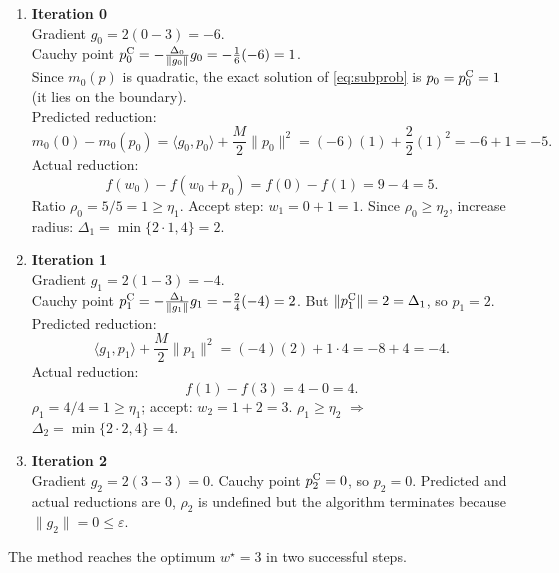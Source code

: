 \documentclass{article}
\begin{document}
\begin{enumerate}[label=Iteration \arabic*:, leftmargin=*]
\item \textbf{Iteration 0}\\
Gradient $g_0=2(0-3)=-6$.\\
Cauchy point $p^{\rm C}_0= -\frac{\Delta_0}{\|g_0\|}g_0 = -\frac{1}{6}(-6)=1$.\\
Since $m_0(p)$ is quadratic, the exact solution of \eqref{eq:subprob} is $p_0=p^{\rm C}_0=1$ (it lies on the boundary).\\
Predicted reduction:
\[
m_0(0)-m_0(p_0)=\langle g_0,p_0\rangle+\frac{M}{2}\|p_0\|^2
 =(-6)(1)+\frac{2}{2}(1)^2 =-6+1=-5.
\]
Actual reduction:
\[
f(w_0)-f(w_0+p_0)=f(0)-f(1)=9-4=5.
\]
Ratio $\rho_0 = 5/5 =1\ge\eta_1$. Accept step: $w_1=0+1=1$.  
Since $\rho_0\ge\eta_2$, increase radius: $\Delta_1=\min\{2\cdot1,4\}=2$.

\item \textbf{Iteration 1}\\
Gradient $g_1=2(1-3)=-4$.\\
Cauchy point $p^{\rm C}_1=-\frac{\Delta_1}{\|g_1\|}g_1=-\frac{2}{4}(-4)=2$.  
But $\|p^{\rm C}_1\|=2=\Delta_1$, so $p_1=2$.\\
Predicted reduction:
\[
\langle g_1,p_1\rangle+\frac{M}{2}\|p_1\|^2 = (-4)(2)+1\cdot 4 = -8+4 = -4.
\]
Actual reduction:
\[
f(1)-f(3)=4-0=4.
\]
$\rho_1=4/4=1\ge\eta_1$; accept: $w_2=1+2=3$.  
$\rho_1\ge\eta_2$ $\Rightarrow$ $\Delta_2=\min\{2\cdot2,4\}=4$.

\item \textbf{Iteration 2}\\
Gradient $g_2=2(3-3)=0$.  
Cauchy point $p^{\rm C}_2=0$, so $p_2=0$.  
Predicted and actual reductions are $0$, $\rho_2$ is undefined but the algorithm terminates because $\|g_2\|=0\le\varepsilon$.
\end{enumerate}
The method reaches the optimum $w^\star=3$ in two successful steps.
\end{document}
